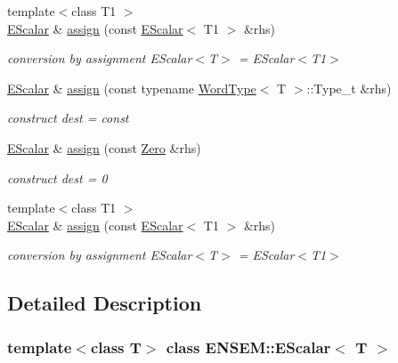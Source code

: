 \begin{DoxyCompactItemize}
{\footnotesize template$<$class T1 $>$ }\\\mbox{\hyperlink{classENSEM_1_1EScalar}{E\+Scalar}} \& \mbox{\hyperlink{classENSEM_1_1EScalar_aa9a54e03830d13eb6a124c64c6a46dd1}{assign}} (const \mbox{\hyperlink{classENSEM_1_1EScalar}{E\+Scalar}}$<$ T1 $>$ \&rhs)
\begin{DoxyCompactList}\small\item\em conversion by assignment E\+Scalar$<$\+T$>$ = E\+Scalar$<$\+T1$>$ \end{DoxyCompactList}\item 
\mbox{\hyperlink{classENSEM_1_1EScalar}{E\+Scalar}} \& \mbox{\hyperlink{classENSEM_1_1EScalar_a9b88ad4d69d05f69b6483701487ddb74}{assign}} (const typename \mbox{\hyperlink{structENSEM_1_1WordType}{Word\+Type}}$<$ T $>$\+::Type\+\_\+t \&rhs)
\begin{DoxyCompactList}\small\item\em construct dest = const \end{DoxyCompactList}\item 
\mbox{\hyperlink{classENSEM_1_1EScalar}{E\+Scalar}} \& \mbox{\hyperlink{classENSEM_1_1EScalar_a6900444b0a609115a30ef8fc95a43da5}{assign}} (const \mbox{\hyperlink{structENSEM_1_1Zero}{Zero}} \&rhs)
\begin{DoxyCompactList}\small\item\em construct dest = 0 \end{DoxyCompactList}\item 
{\footnotesize template$<$class T1 $>$ }\\\mbox{\hyperlink{classENSEM_1_1EScalar}{E\+Scalar}} \& \mbox{\hyperlink{classENSEM_1_1EScalar_aa9a54e03830d13eb6a124c64c6a46dd1}{assign}} (const \mbox{\hyperlink{classENSEM_1_1EScalar}{E\+Scalar}}$<$ T1 $>$ \&rhs)
\begin{DoxyCompactList}\small\item\em conversion by assignment E\+Scalar$<$\+T$>$ = E\+Scalar$<$\+T1$>$ \end{DoxyCompactList}\end{DoxyCompactItemize}


\subsection{Detailed Description}
\subsubsection*{template$<$class T$>$\newline
class E\+N\+S\+E\+M\+::\+E\+Scalar$<$ T $>$}

